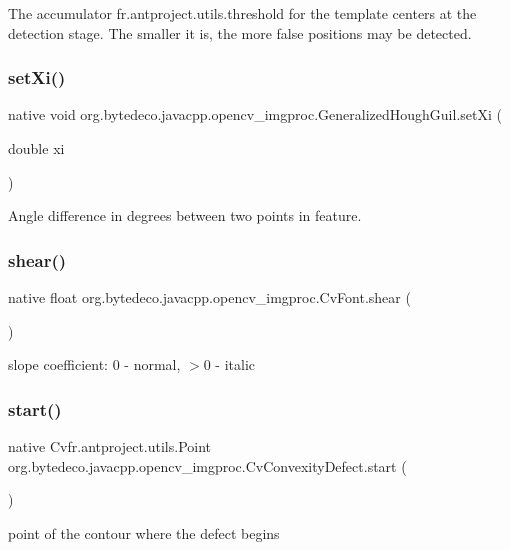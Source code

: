 The accumulator fr.antproject.utils.threshold for the template centers at the detection stage. The smaller it is, the more false positions may be detected. \mbox{\label{group__imgproc_ga7365e9a7f1eca9a3b2f534a0ac7b78ef}}
\subsubsection{\texorpdfstring{set\+Xi()}{setXi()}}
{\footnotesize\ttfamily native void org.\+bytedeco.\+javacpp.\+opencv\+\_\+imgproc.\+Generalized\+Hough\+Guil.\+set\+Xi (\begin{DoxyParamCaption}\item[{double}]{xi }\end{DoxyParamCaption})}

Angle difference in degrees between two points in feature. \mbox{\label{group__imgproc_ga73ceb8658b15dd4f640dae5c1ad07ac7}} 
\subsubsection{\texorpdfstring{shear()}{shear()}}
{\footnotesize\ttfamily native float org.\+bytedeco.\+javacpp.\+opencv\+\_\+imgproc.\+Cv\+Font.\+shear (\begin{DoxyParamCaption}{ }\end{DoxyParamCaption})}

slope coefficient\+: 0 -\/ normal, $>$0 -\/ italic \mbox{\label{group__imgproc_gac3e9f4d6fda01551329024c0375d6ebb}} 
\subsubsection{\texorpdfstring{start()}{start()}}
{\footnotesize\ttfamily native Cv\+fr.antproject.utils.Point org.\+bytedeco.\+javacpp.\+opencv\+\_\+imgproc.\+Cv\+Convexity\+Defect.\+start (\begin{DoxyParamCaption}{ }\end{DoxyParamCaption})}

point of the contour where the defect begins \mbox{\label{group__imgproc_ga223915a9b07b19809dcae507f071bd73}} 
